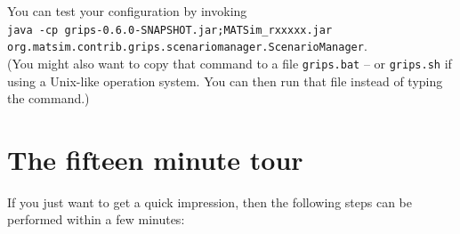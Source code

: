 You can test your configuration by invoking\\ 
\lstinline|java -cp grips-0.6.0-SNAPSHOT.jar;MATSim_rxxxxx.jar|\\ \lstinline|org.matsim.contrib.grips.scenariomanager.ScenarioManager|.\\
(You might also want to copy that command to a file \lstinline|grips.bat| -- or \lstinline|grips.sh| if using a Unix-like operation system. You can then run that file instead of typing the command.)

\section{The fifteen minute tour}\label{evac:section:fifteenminute}
If you just want to get a quick impression, then the following steps can be performed within a few minutes:

